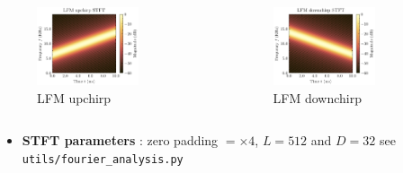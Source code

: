 \documentclass[UKenglish,8pt,aspectratio=1610]{beamer}
\begin{document}
\begin{frame}
\begin{columns}
	\begin{column}{0.5\textwidth}
		\begin{figure}[h!]
			\includegraphics[width=0.7\textwidth]{question1/lfm_up_stft}
			\centering
			\caption{LFM upchirp}
		\end{figure}
	\end{column}
\begin{column}{0.5\textwidth}
	\begin{figure}[h!]
		\includegraphics[width=0.7\textwidth]{question1/lfm_down_stft}
		\centering
		\caption{LFM downchirp}
	\end{figure}
\end{column}
\end{columns}
\begin{itemize}
	\item \textbf{STFT parameters} : zero padding $= \times 4$, $L = 512$ and $D = 32$  see \texttt{utils/fourier\_analysis.py}
\end{itemize}
\end{frame}
\end{document}
